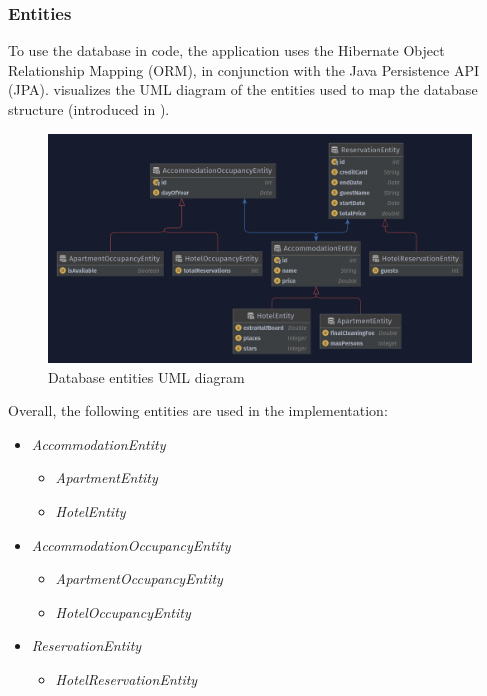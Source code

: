 \subsubsection{Entities}\label{sec:02_design_db_entities}
To use the database in code, the application uses the Hibernate Object Relationship Mapping (ORM), in conjunction with the Java Persistence API (JPA).  visualizes the UML diagram of the entities used to map the database structure (introduced in ).
\begin{figure}[h]
\centering
\includegraphics[scale=0.22]{images/02_design/design-entities}
\caption{Database entities UML diagram}
\label{fig:02_design_db_entities_uml}
\end{figure}
Overall, the following entities are used in the implementation:
\begin{itemize}
\item \textit{AccommodationEntity}
\begin{itemize}
\item \textit{ApartmentEntity}
\item \textit{HotelEntity}
\end{itemize}

\item \textit{AccommodationOccupancyEntity}
\begin{itemize}
\item \textit{ApartmentOccupancyEntity}
\item \textit{HotelOccupancyEntity}
\end{itemize}

\item \textit{ReservationEntity}
\begin{itemize}
\item \textit{HotelReservationEntity}
\end{itemize}
\end{itemize}


